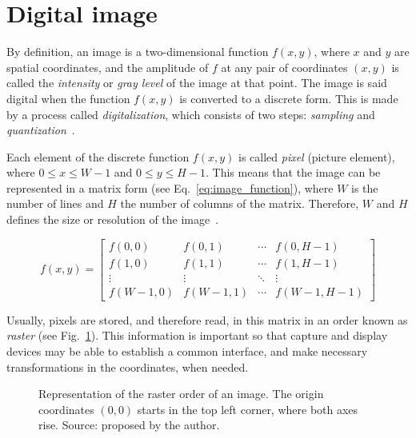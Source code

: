 \section{Digital image}
\label{sec:digital_image}
By definition, an image is a two-dimensional function $f(x, y)$, where $x$ and $y$ are spatial coordinates, and the amplitude of $f$ at any pair of coordinates $(x, y)$ is called the \textit{intensity} or \textit{gray level} of the image at that point. The image is said digital when the function $f(x, y)$ is converted to a discrete form. This is made by a process called \textit{digitalization}, which consists of two steps: \textit{sampling} and \textit{quantization}~\citep{gonzalez:02}.

Each element of the discrete function $f(x, y)$ is called \textit{pixel} (picture element), where $0 \leq x \leq W - 1$ and $0 \leq y \leq H - 1$. This means that the image can be represented in a matrix form (see Eq.~\ref{eq:image_function}), where $W$ is the number of lines and $H$ the number of columns of the matrix. Therefore, $W$ and $H$ defines the size or resolution of the image~\citep{pedrini:08}.

\begin{equation*}
f(x, y) =
 \begin{bmatrix}
  f(0, 0)     & f(0, 1)     & \cdots & f(0, H - 1) \\
  f(1, 0)     & f(1, 1)     & \cdots & f(1, H - 1) \\
  \vdots      & \vdots      & \ddots & \vdots  \\
  f(W - 1, 0) & f(W - 1, 1) & \cdots & f(W - 1, H - 1)
 \end{bmatrix}
\label{eq:image_function}
\end{equation*}

Usually, pixels are stored, and therefore read, in this matrix in an order known as \textit{raster} (see Fig.~\ref{fig:raster}). This information is important so that capture and display devices may be able to establish a common interface, and make necessary transformations in the coordinates, when needed.

\begin{figure}[ht]
    \centering

    \caption[Representation of the raster order of an image]{Representation of the raster order of an image. The origin coordinates $(0, 0)$ starts in the top left corner, where both axes rise. Source: proposed by the author.}
    \label{fig:raster}
\end{figure}


